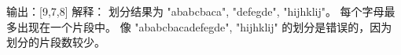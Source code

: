 输出：[9,7,8]
解释：
划分结果为 "ababcbaca", "defegde", "hijhklij"。
每个字母最多出现在一个片段中。
像 "ababcbacadefegde", "hijhklij" 的划分是错误的，因为划分的片段数较少。
